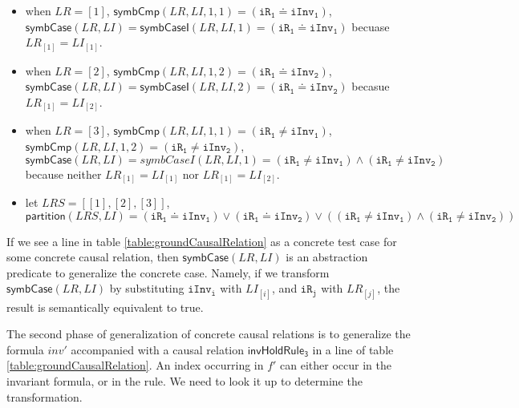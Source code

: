 \documentclass[conference]{IEEEtran}
\def \eqc {\doteq }
\def \iInv {iInv}
\def \iR {iR}
\begin{document}
{\begin{itemize}
  \item when $LR=[1]$, $\mathsf{symbCmp}(LR,LI,1,1)=(\mathtt{\iR_1} \eqc \mathtt{\iInv_1})$, $\mathsf{symbCase}(LR,LI)=\mathsf{symbCaseI}(LR,LI,1)=(\mathtt{\iR_1} \eqc \mathtt{\iInv_1})$ becuase $LR_{[1]}=LI_{[1]}$.

  \item when $LR=[2]$, $\mathsf{symbCmp}(LR,LI,1,2)= (\mathtt{\iR_1} \eqc \mathtt{\iInv_2})$, $\mathsf{symbCase}(LR,LI)=\mathsf{symbCaseI}(LR,LI,2)=(\mathtt{\iR_1} \eqc \mathtt{\iInv_2})$ becasue $LR_{[1]}=LI_{[2]}$.


 \item when  $LR=[3]$, $\mathsf{symbCmp}(LR,LI,1,1)=(\mathtt{\iR_1} \ne \mathtt{\iInv_1})$, $\mathsf{symbCmp}(LR,LI,1,2) = (\mathtt{\iR_1} \ne \mathtt{\iInv_2})$, $\mathsf{symbCase}(LR,LI)=symbCaseI(LR,LI,1)= (\mathtt{\iR_1} \ne \mathtt{\iInv_1}) \wedge  (\mathtt{\iR_1} \ne \mathtt{\iInv_2})$ because neither $LR_{[1]}=LI_{[1]}$ nor $LR_{[1]}=LI_{[2]}$.

  \item let $LRS=[[1],[2],[3]]$, $\mathsf{partition}(LRS,LI)= (\mathtt{\iR_1} \eqc \mathtt{\iInv_1}) \vee (\mathtt{\iR_1} \eqc \mathtt{\iInv_2}) \vee ( (\mathtt{\iR_1} \ne \mathtt{\iInv_1}) \wedge  (\mathtt{\iR_1} \ne \mathtt{\iInv_2}))$
\end{itemize}

If we see a line  in table \ref{table:groundCausalRelation} as a concrete test case for some concrete causal relation,  then $\mathsf{symbCase}(LR, LI)$ is an abstraction predicate to generalize the concrete case. Namely, if we transform $\mathsf{symbCase}(LR, LI)$ by substituting $\mathtt{\iInv_i}$ with $LI_{[i]}$, and $\mathtt{\iR_j}$ with $LR_{[j]}$, the result is semantically equivalent to true. %

The second phase of generalization of concrete causal relations is to generalize the formula $inv'$ accompanied with a causal relation $\mathsf{invHoldRule_3}$ in a line of table \ref{table:groundCausalRelation}. An index occurring in $f'$ can either  occur in the invariant formula, or in the rule. We need to look it up to determine the  transformation.

}
\end{document}
